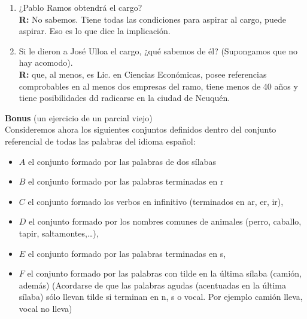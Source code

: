 \documentclass[12pt]{article}
\theoremstyle{definition}
\theoremstyle{remark}
\begin{document}
\begin{enumerate}
\begin{enumerate}
\item ¿Pablo Ramos obtendrá el cargo?\\
\textbf{R:} No sabemos. Tiene todas las condiciones para aspirar al cargo, puede aspirar. Eso es lo que dice la implicación.

\item Si le dieron a José Ulloa el cargo, ¿qué sabemos de él? (Supongamos que no hay acomodo).\\
\textbf{R:} que, al menos, es Lic. en Ciencias Económicas, posee referencias comprobables en al menos dos empresas del ramo, tiene menos de 40 años y tiene posibilidades dd radicarse en la ciudad de Neuquén.
\end{enumerate}
 
\end{enumerate}
\noindent
\textbf{Bonus} (un ejercicio de un parcial viejo)\\
\noindent
Consideremos ahora los siguientes conjuntos definidos dentro del conjunto referencial de todas las palabras del idioma español:
\begin{itemize}
	\item $A$ el conjunto formado por las palabras de dos sílabas
	\item $B$ el conjunto formado por las palabras terminadas en r
	\item $C$ el conjunto formado los verbos en infinitivo (terminados en ar, er, ir), 
	\item $D$ el conjunto formado por los nombres comunes de animales (perro, caballo, tapir, saltamontes,…), 
	\item $E$ el conjunto formado por las palabras terminadas en s, 
	\item $F$ el conjunto formado por las palabras con tilde en la última sílaba (camión, además) (Acordarse de que las palabras agudas (acentuadas en la última sílaba) sólo llevan tilde si terminan en n, s o vocal. Por ejemplo camión lleva, vocal no lleva)
\end{itemize}
\end{document}
